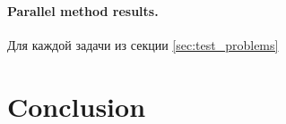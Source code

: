 \documentclass{llncs}
\begin{document}
\paragraph{Parallel method results.} Для каждой задачи из секции \ref{sec:test_problems}

\section{Conclusion}
%
%
%
%

%


\clearpage
{} %
\renewcommand{\indexname}{Author Index}
\printindex
\clearpage
\end{document}
